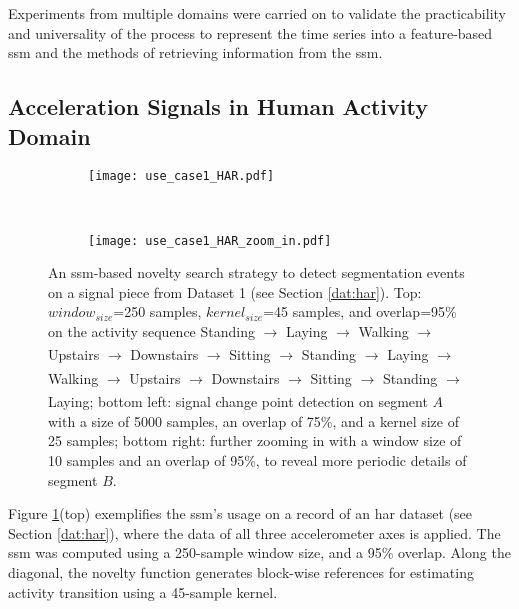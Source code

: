 Experiments from multiple domains were carried on to validate the practicability and universality of the process to represent the time series into a feature-based \gls{ssm} and the methods of retrieving information from the \gls{ssm}.

\subsection{Acceleration Signals in Human Activity Domain}
\label{sec:acc_har}

\begin{figure}
    \centering
    \begin{subfigure}[b]{\textwidth}
        \centering
        \texttt{[image: use\_case1\_HAR.pdf]}
    \end{subfigure}\\
    \vspace{2mm}
    \begin{subfigure}[b]{\textwidth}
         \centering
        \texttt{[image: use\_case1\_HAR\_zoom\_in.pdf]}     
    \end{subfigure}
    \caption{An \gls{ssm}-based novelty search strategy to detect segmentation events on a signal piece from Dataset 1 (see Section \ref{dat:har}). Top: $window_{size}$=250 samples, $kernel_{size}$=45 samples, and overlap=95\% on the activity sequence Standing $\xrightarrow[]{}$ Laying $\xrightarrow[]{}$ Walking $\xrightarrow[]{}$ Upstairs $\xrightarrow[]{}$ Downstairs $\xrightarrow[]{}$ Sitting $\xrightarrow[]{}$ Standing $\xrightarrow[]{}$ Laying $\xrightarrow[]{}$ Walking $\xrightarrow[]{}$ Upstairs
    $\xrightarrow[]{}$ Downstairs $\xrightarrow[]{}$ Sitting $\xrightarrow[]{}$ Standing
    $\xrightarrow[]{}$ Laying; bottom left: signal change point detection on segment $A$ with a size of 5000 samples, an overlap of 75\%, and a kernel size of 25 samples; bottom right: further zooming in with a window size of 10 samples and an overlap of 95\%, to reveal more periodic details of segment $B$.}
    \label{fig:use_case1}
\end{figure}


Figure \ref{fig:use_case1}(top) exemplifies the \gls{ssm}'s usage on a record of an \gls{har} dataset (see Section \ref{dat:har}), where the data of all three accelerometer axes is applied. The \gls{ssm} was computed using a 250-sample window size, and a 95\% overlap. Along the diagonal, the novelty function generates block-wise references for estimating activity transition using a 45-sample kernel.

